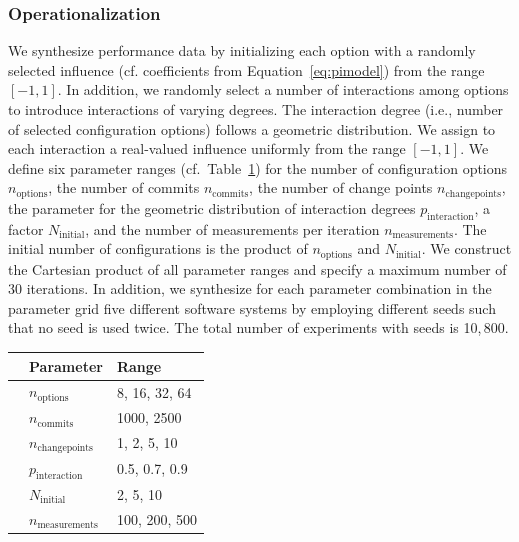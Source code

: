 \documentclass[sigconf, screen]{acmart}
\begin{document}
	\subsubsection{Operationalization}
	We synthesize performance data by initializing each option with a randomly selected influence (cf. coefficients from Equation~\ref{eq:pimodel}) from the range $\left[-1,1 \right]$. In addition, we randomly select a number of interactions among options to introduce interactions of varying degrees. The interaction degree (i.e., number of selected configuration options) follows a geometric distribution. We assign to each interaction a real-valued influence uniformly from the range $[-1, 1]$. We define six parameter ranges (cf.~Table~\ref{tab:synthetic_experiment_ranges}) for the number of configuration options $n_\text{options}$, the number of commits $n_\text{commits}$, the number of change points $n_\text{changepoints}$, the parameter for the geometric distribution of interaction degrees $p_\text{interaction}$, a factor $N_\text{initial}$, and the number of measurements per iteration $n_\text{measurements}$. The initial number of configurations is the product of $n_\text{options}$ and $N_\text{initial}$. We construct the Cartesian product of all parameter ranges and specify a maximum number of 30 iterations. In addition, we synthesize for each parameter combination in the parameter grid five different software systems by employing different seeds such that no seed is used twice. The total number of experiments with seeds is 10,\,800.%
	
	\begin{table}
		\centering
		\label{tab:synthetic_experiment_ranges}
		\begin{tabular}{lll}
			\toprule
			\textbf{}                & \textbf{Parameter}        & \multicolumn{1}{l}{\textbf{Range}} \\
			\midrule
			\parbox[t]{20mm}{} & $n_\text{options}$                & 8, 16, 32, 64                \\
			& $n_\text{commits}$                & 1000, 2500                \\
			& $n_\text{changepoints}$           & 1, 2, 5, 10                        \\
			& $p_\text{interaction}$ & 0.5, 0.7, 0.9                     \\
			\midrule
			\parbox[t]{20mm}{}   & $N_\text{initial}$       & 2, 5, 10                           \\
			& $n_\text{measurements}$           & 100, 200, 500                      \\
			\bottomrule            
		\end{tabular}
	\end{table}
	
\end{document}
